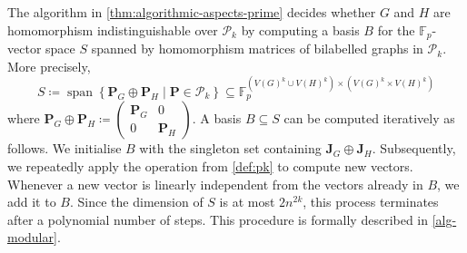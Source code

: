 \documentclass[11pt,a4paper]{article}
\theoremstyle{plain}
\theoremstyle{remark}
\theoremstyle{definition}
\DeclareMathOperator{\spn}{span}
\begin{document}
The algorithm in \cref{thm:algorithmic-aspects-prime} decides whether $G$ and $H$ are homomorphism indistinguishable over $\mathcal{P}_k$ by computing a basis $B$ for the $\mathbb{F}_p$-vector space $S$ spanned by homomorphism matrices of bilabelled graphs in $\mathcal{P}_k$. More precisely,
\[
    S \coloneqq \spn\left\{ \boldsymbol{P}_G\oplus \boldsymbol{P}_H \mid \boldsymbol{P} \in \mathcal{P}_k \right\} \subseteq \mathbb{F}_p^{(V(G)^k \cup V(H)^k) \times (V(G)^k \times V(H)^k)}
\]
where $\boldsymbol{P}_G \oplus \boldsymbol{P}_H \coloneqq \left( \begin{smallmatrix} \boldsymbol{P}_G & 0 \\ 0 & \boldsymbol{P}_H \end{smallmatrix} \right)$.
A basis $B \subseteq S$ can be computed iteratively as follows.
We initialise $B$ with the singleton set containing $\boldsymbol{J}_G \oplus \boldsymbol{J}_H$.
Subsequently, we repeatedly apply the operation from \cref{def:pk} to compute new vectors. 
Whenever a new vector is linearly independent from the vectors already in $B$, we add it to $B$.
Since the dimension of $S$ is at most $2n^{2k}$, this process terminates after a polynomial number of steps.
This procedure is formally described in \cref{alg-modular}.
\end{document}
